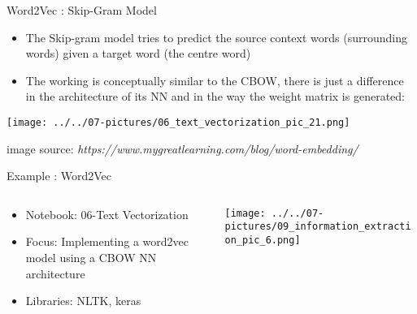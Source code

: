 \documentclass[11pt]{beamer}
\begin{document}
\begin{frame}{Word2Vec : Skip-Gram Model}
	\begin{itemize}
		\item The Skip-gram model tries to predict the source context words (surrounding words) given a target word (the centre word)
		\item The working is conceptually similar to the CBOW, there is just a difference in the architecture of its NN and in the way the weight matrix is generated:	 
	\end{itemize}
	\begin{center}
	\texttt{[image: ../../07-pictures/06\_text\_vectorization\_pic\_21.png]}
	\end{center}
	\footnotesize{image source: \textit{https://www.mygreatlearning.com/blog/word-embedding/}}
\end{frame}
\begin{frame}{Example : Word2Vec}
\begin{columns}[T] %
\begin{column}{.48\textwidth}
        \begin{itemize}
		\item Notebook: 06-Text Vectorization
		\item Focus: Implementing a word2vec model using a CBOW NN architecture
		\item Libraries: NLTK, keras
        \end{itemize}
\end{column}%
\hfill%
\begin{column}{.48\textwidth}
        \texttt{[image: ../../07-pictures/09\_information\_extraction\_pic\_6.png]}
\end{column}%
\end{columns}
\end{frame}
\end{document}
